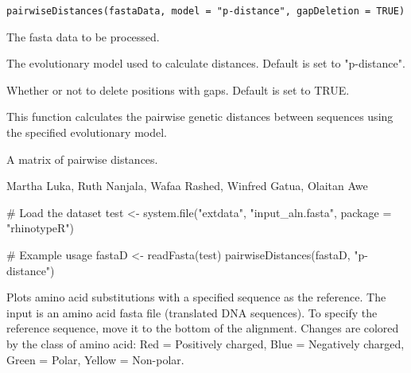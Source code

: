 \documentclass[a4paper]{book}
\begin{document}
%
\begin{Usage}
\begin{verbatim}
pairwiseDistances(fastaData, model = "p-distance", gapDeletion = TRUE)
\end{verbatim}
\end{Usage}
%
\begin{Arguments}
\begin{ldescription}
\item[\code{fastaData}] 
The fasta data to be processed.

\item[\code{model}] 
The evolutionary model used to calculate distances. Default is set to "p-distance".

\item[\code{gapDeletion}] 
Whether or not to delete positions with gaps. Default is set to TRUE.

\end{ldescription}
\end{Arguments}
%
\begin{Details}
This function calculates the pairwise genetic distances between sequences using the specified evolutionary model.
\end{Details}
%
\begin{Value}
A matrix of pairwise distances.
\end{Value}
%
\begin{Author}
Martha Luka, Ruth Nanjala, Wafaa Rashed, Winfred Gatua, Olaitan Awe 
\end{Author}
%
\begin{SeeAlso}
\end{SeeAlso}
%
\begin{Examples}
\begin{ExampleCode}
# Load the dataset
test <- system.file("extdata", "input_aln.fasta", package = "rhinotypeR")

# Example usage
fastaD <- readFasta(test)
pairwiseDistances(fastaD, "p-distance")
\end{ExampleCode}
\end{Examples}
%
\begin{Description}
Plots amino acid substitutions with a specified sequence as the reference. 
The input is an amino acid fasta file (translated DNA sequences). 
To specify the reference sequence, move it to the bottom of the alignment. 
Changes are colored by the class of amino acid: 
Red = Positively charged, Blue = Negatively charged, Green = Polar, Yellow = Non-polar.
\end{Description}
\end{document}
